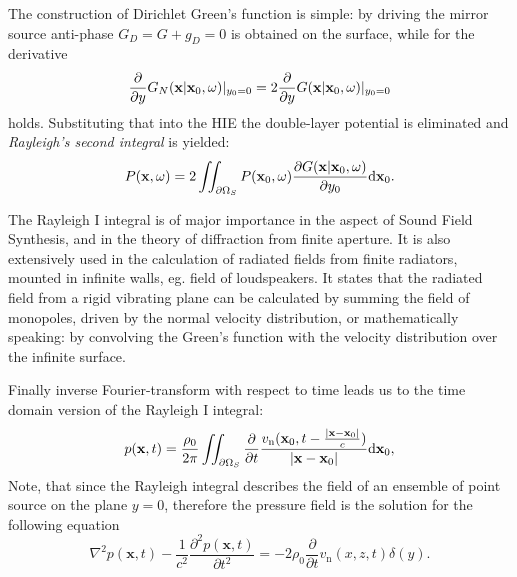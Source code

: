 \vspace{3mm}
The construction of Dirichlet Green's function is simple: by driving the mirror source anti-phase $G_D = G + g_D = 0$ is obtained on the surface, while for the derivative
\begin{equation}
\frac{\partial}{\partial y} G_N(\mathbf{x}|\mathbf{x}_0,\omega)|_{y_0 = 0} = 2 \frac{\partial}{\partial y} G(\mathbf{x}|\mathbf{x}_0,\omega)|_{y_0 = 0}
\end{equation}
holds. Substituting that into the HIE the double-layer potential is eliminated and \emph{Rayleigh's second integral} is yielded:
\begin{equation}
P(\mathbf{x},\omega) = 
2 \iint_{\partial \Omega_S}  P(\mathbf{x}_0,\omega)  \frac{\partial G(\mathbf{x}|\mathbf{x}_0,\omega)}{\partial y_0}     \mathrm{d} \mathbf{x}_0.
\label{Eq:Theory:RayleighII}
\end{equation}

The Rayleigh I integral is of major importance in the aspect of Sound Field Synthesis, and in the theory of diffraction from finite aperture. It is also extensively used in the calculation of radiated fields from finite radiators, mounted in infinite walls, eg. field of loudspeakers. It states that the radiated field from a rigid vibrating plane can be calculated by summing the field of monopoles, driven by the normal velocity distribution, or mathematically speaking: by convolving the Green's function with the velocity distribution over the infinite surface.

\vspace{3mm}
Finally inverse Fourier-transform with respect to time leads us to the time domain version of the Rayleigh I integral\cite{Pierce1991}:
\begin{equation}
p(\mathbf{x},t) = \frac{\rho_0}{2\pi} \iint_{\partial \Omega_S} \frac{\partial}{\partial t} \frac{v_{\mathrm{n}}(\mathbf{x}_0,t-\frac{ | \mathbf{x}-\mathbf{x}_0 | }{c})}{| \mathbf{x}-\mathbf{x}_0 |} \mathrm{d} \mathbf{x}_0,
\end{equation}
Note, that since the Rayleigh integral describes the field of an ensemble of point source on the plane $y = 0$, therefore the pressure field is the solution for the following equation \cite{Pierce1991}
\begin{equation}
\nabla^2 p(\mathbf{x},t) - \frac{1}{c^2}\frac{\partial^2 p(\mathbf{x},t)}{\partial t^2} = -2\rho_0 \frac{\partial}{\partial t} v_{\mathrm{n}}(x,z,t)\delta(y).
\end{equation}

\newpage
